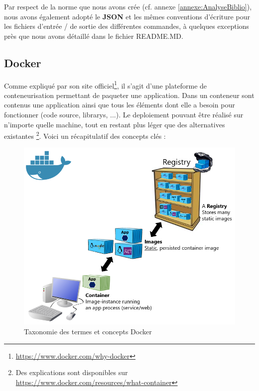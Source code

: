 Par respect de la norme que nous avons crée (cf. annexe \ref{annexe:AnalyseBiblio}), nous avons également adopté le \textbf{JSON} et les mêmes conventions d'écriture 
pour les fichiers d'entrée / de sortie des différentes commandes, à quelques exceptions près que nous avons détaillé dans le fichier README.MD. 

\pagebreak
\subsection{Docker}
\label{section:docker}

Comme expliqué par son site officiel\footnote{
    \url{https://www.docker.com/why-docker}
}, il s'agit d'une plateforme de conteneurisation permettant de paqueter une application.
Dans un conteneur sont contenus une application ainsi que tous les éléments dont elle a besoin pour fonctionner (code source, \glspl{library}, ...).
Le \gls{deploiement} pouvant être réalisé sur n'importe quelle machine, tout en restant plus léger que des alternatives existantes
\footnote{
    Des explications sont disponibles sur \url{https://www.docker.com/resources/what-container}
}.
Voici un récapitulatif des concepts clés :

\begin{figure}[H]
    \includegraphics[width=\textwidth,height=0.38\textheight,keepaspectratio]{images/serveur/dockerTaxonomy.png}
    \centering
    \caption[Taxonomie des termes et concepts Docker]{Taxonomie des termes et concepts Docker \footnotemark}
    \label{fig:dockerTaxonomy}
\end{figure}

